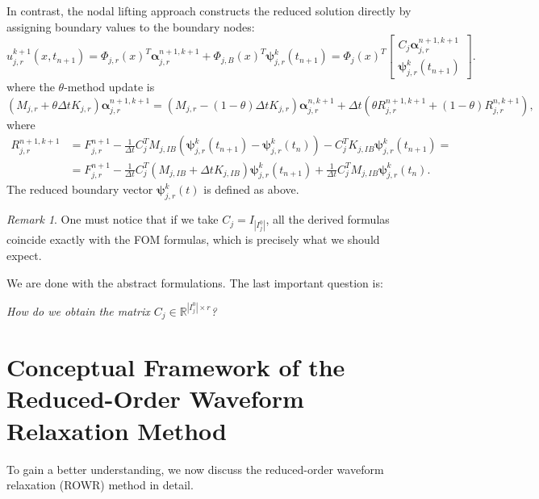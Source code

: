 \documentclass[a4paper, 11pt]{article}
\theoremstyle{remark}
\newtheorem{remark}[equation]{Remark}
\begin{document}
In contrast, the nodal lifting approach constructs the reduced solution directly by assigning boundary values to the boundary nodes:
\begin{equation*}
    u^{k+1}_{j, r}(x, t_{n+1}) = \Phi_{j, r}(x)^{T}\boldsymbol{\alpha}_{j, r}^{n+1, k+1} + \Phi_{j, B}(x)^{T}\boldsymbol{\psi}_{j, r}^{k}(t_{n+1}) = \Phi_{j}(x)^{T}
    \begin{bmatrix}
        C_{j}\boldsymbol{\alpha}_{j, r}^{n+1, k+1}\\
        \boldsymbol{\psi}_{j, r}^{k}(t_{n+1})
    \end{bmatrix}.
\end{equation*}
where the $\theta$-method update is
\begin{equation*}
    \left(M_{j, r} + \theta\Delta t K_{j, r}\right) \boldsymbol{\alpha}_{j, r}^{n+1, k+1} = \left(M_{j, r} - (1-\theta)\Delta t K_{j, r}\right)\boldsymbol{\alpha}_{j, r}^{n, k+1} + \Delta t\left(\theta R^{n+1, k+1}_{j, r} + (1-\theta)R^{n, k+1}_{j, r}\right),
\end{equation*}
where
\begin{align*}
    R^{n+1, k+1}_{j, r} &= F^{n+1}_{j, r} - \frac{1}{\Delta t}C_{j}^{T}M_{j, IB}\left(\boldsymbol{\psi}_{j, r}^{k}(t_{n+1}) - \boldsymbol{\psi}_{j, r}^{k}(t_{n})\right) - C_{j}^{T}K_{j, IB}\boldsymbol{\psi}_{j, r}^{k}(t_{n+1}) =\\
    &= F^{n+1}_{j, r} - \frac{1}{\Delta t}C_{j}^{T}\left(M_{j, IB} +\Delta t K_{j, IB}\right)\boldsymbol{\psi}_{j, r}^{k}(t_{n+1}) + \frac{1}{\Delta t}C_{j}^{T}M_{j, IB}\boldsymbol{\psi}_{j, r}^{k}(t_{n}).
\end{align*}
The reduced boundary vector $\boldsymbol{\psi}_{j, r}^{k}(t)$ is defined as above. 
\begin{remark}
    One must notice that if we take $C_{j} = I_{|I^{0}_{j}|}$, all the derived formulas coincide exactly with the FOM formulas, which is precisely what we should expect.
\end{remark}
\noindent We are done with the abstract formulations. The last important question is:
\begin{center}
    \textit{How do we obtain the matrix $C_{j}\in \mathbb{R}^{|I_{j}^{0}|\times r}$?}    
\end{center}
\section{Conceptual Framework of the Reduced-Order Waveform Relaxation Method}
To gain a better understanding, we now discuss the reduced-order waveform relaxation (ROWR) method in detail.
\end{document}
